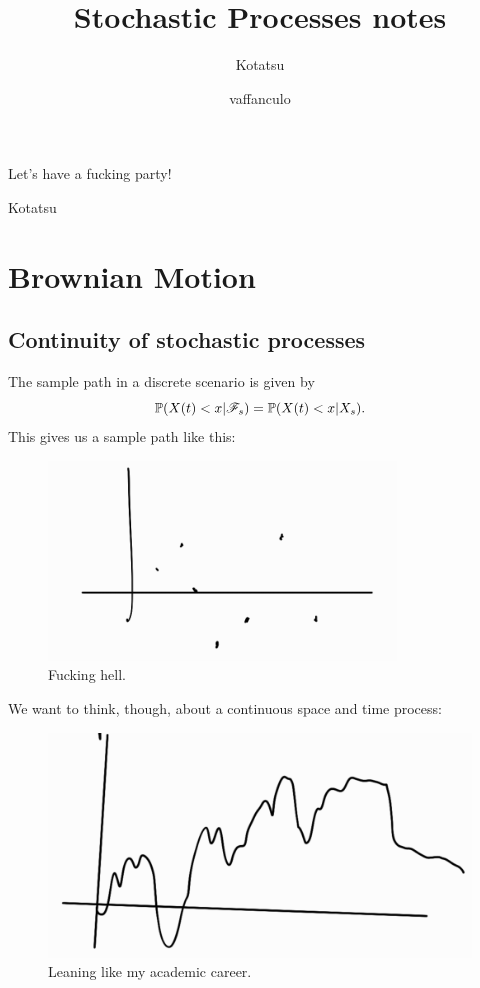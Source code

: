 \documentclass{report}
\begin{document}
	\title{Stochastic Processes notes}
	\author{Kotatsu}
	\date{\small vaffanculo}
	\maketitle
	\begin{preface}
Let's have a fucking party!
		
		\vskip1.2cm
		
		\hfill Kotatsu
	\end{preface}
	\clearpage
	\tableofcontents
\chapter{Brownian Motion}	
	\section{Continuity of stochastic processes}
	The sample path in a discrete scenario is given by
	\begin{equation*}
		\mathbb{P}(X(t)<x|\mathscr{F}_{s})=\mathbb{P}(X(t)<x|X_{s}).
	\end{equation*}
	This gives us a sample path like this:
	\begin{figure}[H]
		\centering
		\includegraphics[width=0.7\linewidth]{img/screenshot003}
		\caption{Fucking hell.}
		\label{fig:screenshot003}
	\end{figure}
	We want to think, though, about a continuous space and time process: 
	\begin{figure}[H]
		\centering
		\includegraphics[width=0.7\linewidth]{img/screenshot004}
		\caption{Leaning like my academic career.}
		\label{fig:screenshot004}
	\end{figure}
\end{document}
